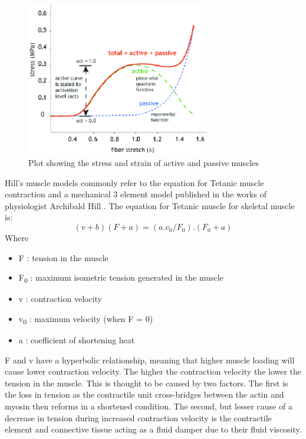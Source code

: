\begin{figure}[h!]
  \centering
  \includegraphics[width=8cm]{Figures/Muscle-fiber-active-and-passive-behavior.png}
  \caption{Plot showing the stress and strain of active and passive muscles \citep{Teran2003}}
  \label{fig:Muscle}
\end{figure}

Hill's muscle models commonly refer to the equation for Tetanic muscle contraction and a mechanical 3 element model published in the works of physiologist Archibald Hill \citep{Hill1938}. The equation for Tetanic muscle for skeletal muscle is: \begin{equation}
    (v+b)(F+a)=(a.v_0/F_0).(F_0+a)
\end{equation}
Where 
\begin{itemize}
    \item F : tension in the muscle
    \item F\textsubscript{0} : maximum isometric tension generated in the muscle
    \item v : contraction velocity
    \item v\textsubscript{0}  : maximum velocity (when F = 0)
    \item a : coefficient of shortening heat
\end{itemize}
F and v have a hyperbolic relationship, meaning that higher muscle loading will cause lower contraction velocity. The higher the contraction velocity the lower the tension in the muscle. This is thought to be caused by two factors. The first is the loss in tension as the contractile unit cross-bridges between the actin and myosin then reforms in a shortened condition. The second, but lesser cause of a decrease in tension during increased contraction velocity is the contractile element and connective tissue acting as a fluid damper due to their fluid viscosity\citep{Fung1993}.

